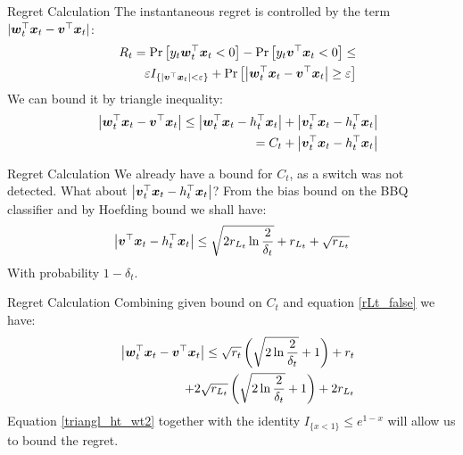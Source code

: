 \documentclass{beamer}
\begin{document}
\begin{frame}{Regret Calculation}
The instantaneous regret is controlled by the term $|{{\boldsymbol{w}}}^{\top}_{t}{\boldsymbol{x}}_{t}-{{\boldsymbol{v}}}^{\top}{\boldsymbol{x}}_{t}|$:
\begin{eqnarray}
&&R_t={\rm Pr}\left[{y_t{{\boldsymbol{w}}}^{\top}_{t}{\boldsymbol{x}}_{t}<0}\right]-{\rm Pr}\left[{y_t{{\boldsymbol{v}}}^{\top}{\boldsymbol{x}}_{t}<0}\right]\leq\nonumber\\
&&\varepsilon I_{\{\left|{{\boldsymbol{v}}}^{\top}{\boldsymbol{x}}_{t}\right|<\varepsilon\}}+{\rm Pr}\left[{\left|{{\boldsymbol{w}}}^{\top}_{t}{\boldsymbol{x}}_{t}-{{\boldsymbol{v}}}^{\top}{\boldsymbol{x}}_{t}\right|\geq\varepsilon}\right]
\label{regret_wt_ht1}
\end{eqnarray}
We can bound it by triangle inequality:
\begin{eqnarray}
&&\left\vert{{\boldsymbol{w}}}^{\top}_{t}{\boldsymbol{x}}_{t}-{{\boldsymbol{v}}}^{\top}{\boldsymbol{x}}_{t}\right\vert\leq\left\vert{{\boldsymbol{w}}}^{\top}_{t}{\boldsymbol{x}}_{t}-h_{t}^{\top}{\boldsymbol{x}}_{t}\right\vert+\left\vert{{\boldsymbol{v}}}^{\top}_{t}{\boldsymbol{x}}_{t}-h_{t}^{\top}{\boldsymbol{x}}_{t}\right\vert\nonumber\\
&&=C_t+\left\vert{{\boldsymbol{v}}}^{\top}_{t}{\boldsymbol{x}}_{t}-h_{t}^{\top}{\boldsymbol{x}}_{t}\right\vert
\label{triangl_ht_wt}
\end{eqnarray}
\end{frame}

\begin{frame}{Regret Calculation}
We already have a bound for $C_t$, as a switch was not detected. What about $\left\vert{{\boldsymbol{v}}}^{\top}_{t}{\boldsymbol{x}}_{t}-h_{t}^{\top}{\boldsymbol{x}}_{t}\right\vert$?\newline\newline
From the bias bound on the BBQ classifier and by Hoefding bound we shall have:
\begin{equation}
\left\vert{{\boldsymbol{v}}}^{\top}{\boldsymbol{x}}_{t}-h_{t}^{\top}{\boldsymbol{x}}_{t}\right\vert\leq\sqrt{2r_{L_t}\ln{\frac{2}{\delta_t}}}+r_{L_t}+\sqrt{r_{L_t}}
\label{rLt_false}
\end{equation}
With probability $1-\delta_t$.
\end{frame}



\begin{frame}{Regret Calculation}
Combining given bound on $C_t$ and equation \ref{rLt_false} we have:
\begin{eqnarray}
&&\left\vert{{\boldsymbol{w}}}^{\top}_{t}{\boldsymbol{x}}_{t}-{{\boldsymbol{v}}}^{\top}{\boldsymbol{x}}_{t}\right\vert\leq\sqrt{r_t}\left(\sqrt{2\ln{\frac{2}{\delta_t}}}+1\right)+r_t\nonumber\\
&&+2\sqrt{r_{L_t}}\left(\sqrt{2\ln{\frac{2}{\delta_t}}}+1\right)+2r_{L_t}
\label{triangl_ht_wt2}
\end{eqnarray}
Equation \ref{triangl_ht_wt2} together with the identity  $I_{\{x<1\}}\leq e^{1-x}$ will allow us to bound the regret.
\end{frame}
\end{document}
